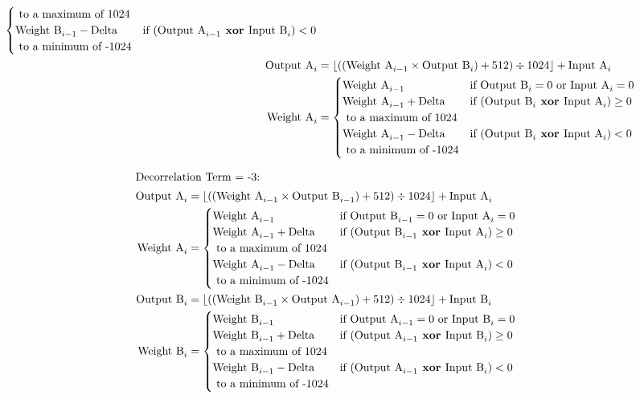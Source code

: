 \begin{align*}
\begin{cases}
\text{ to a maximum of 1024} \\
\text{Weight B}_{i - 1} - \text{Delta} & \text{if } (\text{Output A}_{i - 1} \textbf{ xor } \text{Input B}_i) < 0 \\
\text{ to a minimum of -1024}
\end{cases} \\
\text{Output A}_i &= \lfloor ((\text{Weight A}_{i - 1} \times \text{Output B}_i) + 512) \div 1024 \rfloor + \text{Input A}_i \\
\text{Weight A}_i &=
\begin{cases}
\text{Weight A}_{i - 1} & \text{if } \text{Output B}_i = 0 \text{ or } \text{Input A}_i = 0 \\
\text{Weight A}_{i - 1} + \text{Delta} & \text{if } (\text{Output B}_i \textbf{ xor } \text{Input A}_i) \geq 0 \\
\text{ to a maximum of 1024} \\
\text{Weight A}_{i - 1} - \text{Delta} & \text{if } (\text{Output B}_i \textbf{ xor } \text{Input A}_i) < 0 \\
\text{ to a minimum of -1024}
\end{cases}
\end{align*}

\clearpage

\begin{align*}
\intertext{Decorrelation Term = -3:}
\text{Output A}_i &= \lfloor ((\text{Weight A}_{i - 1} \times \text{Output B}_{i - 1}) + 512) \div 1024 \rfloor + \text{Input A}_i \\
\text{Weight A}_i &=
\begin{cases}
\text{Weight A}_{i - 1} & \text{if } \text{Output B}_{i - 1} = 0 \text{ or } \text{Input A}_i = 0 \\
\text{Weight A}_{i - 1} + \text{Delta} & \text{if } (\text{Output B}_{i - 1} \textbf{ xor } \text{Input A}_i) \geq 0 \\
\text{ to a maximum of 1024} \\
\text{Weight A}_{i - 1} - \text{Delta} & \text{if } (\text{Output B}_{i - 1} \textbf{ xor } \text{Input A}_i) < 0 \\
\text{ to a minimum of -1024}
\end{cases} \\
\text{Output B}_i &= \lfloor ((\text{Weight B}_{i - 1} \times \text{Output A}_{i - 1}) + 512) \div 1024 \rfloor + \text{Input B}_i \\
\text{Weight B}_i &=
\begin{cases}
\text{Weight B}_{i - 1} & \text{if } \text{Output A}_{i - 1} = 0 \text{ or } \text{Input B}_i = 0 \\
\text{Weight B}_{i - 1} + \text{Delta} & \text{if } (\text{Output A}_{i - 1} \textbf{ xor } \text{Input B}_i) \geq 0 \\
\text{ to a maximum of 1024} \\
\text{Weight B}_{i - 1} - \text{Delta} & \text{if } (\text{Output A}_{i - 1} \textbf{ xor } \text{Input B}_i) < 0 \\
\text{ to a minimum of -1024}
\end{cases}
\end{align*}

